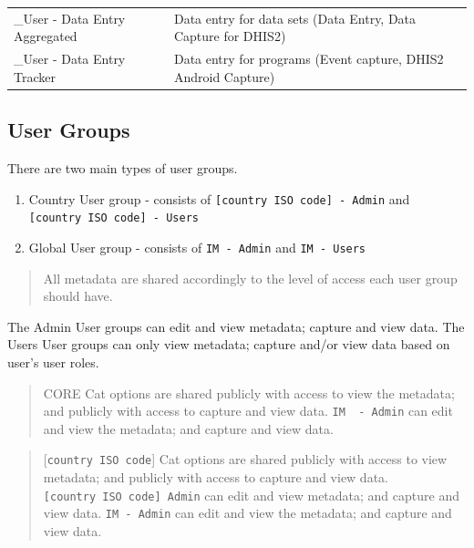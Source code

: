 \documentclass[]{book}
\providecommand{\tightlist}{%
  \setlength{\itemsep}{0pt}\setlength{\parskip}{0pt}}
\begin{document}
\begin{longtable}[]{@{}ll@{}}
\begin{minipage}[t]{0.33\columnwidth}
\_User - Data Entry Aggregated\strut
\end{minipage} & \begin{minipage}[t]{0.61\columnwidth}\raggedright
Data entry for data sets (Data Entry, Data Capture for DHIS2)\strut
\end{minipage}\tabularnewline
\begin{minipage}[t]{0.33\columnwidth}\raggedright
\_User - Data Entry Tracker\strut
\end{minipage} & \begin{minipage}[t]{0.61\columnwidth}\raggedright
Data entry for programs (Event capture, DHIS2 Android Capture)\strut
\end{minipage}\tabularnewline
\bottomrule
\end{longtable}

\hypertarget{user-groups}{%
\subsection{User Groups}\label{user-groups}}

There are two main types of user groups.

\begin{enumerate}
\def\labelenumi{\arabic{enumi}.}
\tightlist
\item
  Country User group - consists of \texttt{{[}country\ ISO\ code{]}\ -\ Admin} and \texttt{{[}country\ ISO\ code{]}\ -\ Users}
\item
  Global User group - consists of \texttt{IM\ -\ Admin} and \texttt{IM\ -\ Users}
\end{enumerate}

\begin{quote}
All metadata are shared accordingly to the level of access each user group should have.
\end{quote}

The Admin User groups can edit and view metadata; capture and view data. The Users User groups can only view metadata; capture and/or view data based on user's user roles.

\begin{quote}
CORE Cat options are shared publicly with access to view the metadata; and publicly with access to capture and view data. \texttt{IM\ \ -\ Admin} can edit and view the metadata; and capture and view data.
\end{quote}

\begin{quote}
{[}\texttt{country\ ISO\ code}{]} Cat options are shared publicly with access to view metadata; and publicly with access to capture and view data. \texttt{{[}country\ ISO\ code{]}\ Admin} can edit and view metadata; and capture and view data. \texttt{IM\ -\ Admin} can edit and view the metadata; and capture and view data.
\end{quote}
\end{document}
